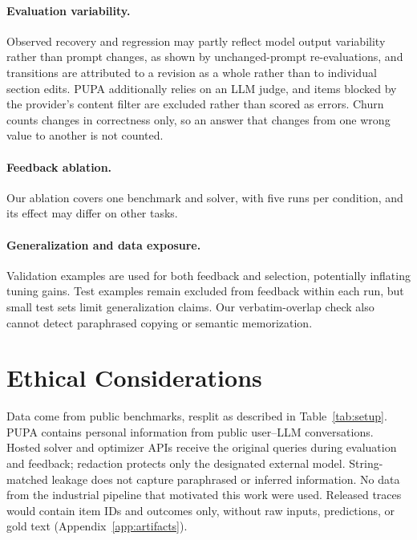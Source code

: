 \documentclass[11pt]{article}
\begin{document}
\paragraph{Evaluation variability.}
Observed recovery and regression may partly reflect model output variability rather than prompt changes, as shown by unchanged-prompt re-evaluations, and transitions are attributed to a revision as a whole rather than to individual section edits. PUPA additionally relies on an LLM judge, and items blocked by the provider's content filter are excluded rather than scored as errors. Churn counts changes in correctness only, so an answer that changes from one wrong value to another is not counted.

\paragraph{Feedback ablation.}
Our ablation covers one benchmark and solver, with five runs per condition, and its effect may differ on other tasks.

\paragraph{Generalization and data exposure.}
Validation examples are used for both feedback and selection, potentially inflating tuning gains. Test examples remain excluded from feedback within each run, but small test sets limit generalization claims. Our verbatim-overlap check also cannot detect paraphrased copying or semantic memorization.


\section*{Ethical Considerations}
Data come from public benchmarks, resplit as described in Table~\ref{tab:setup}. PUPA contains personal information from
public user--LLM conversations. Hosted solver and optimizer APIs receive the original queries during evaluation and
feedback; redaction protects only the designated external model. String-matched leakage does not capture paraphrased or
inferred information. No data from the industrial pipeline that motivated this work were used. Released traces would
contain item IDs and outcomes only, without raw inputs, predictions, or gold text (Appendix~\ref{app:artifacts}).

\FloatBarrier


\appendix
\end{document}

